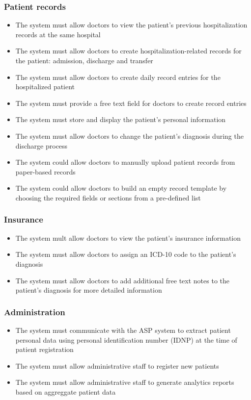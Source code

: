 \subsubsection{Patient records}
\begin{itemize}
    \item The system must allow doctors to view the patient's previous hospitalization records at the same hospital
    \item The system must allow doctors to create hospitalization-related records for the patient: admission, discharge and transfer
    \item The system must allow doctors to create daily record entries for the hospitalized patient
    \item The system must provide a free text field for doctors to create record entries 
    \item The system must store and display the patient's personal information
    \item The system must allow doctors to change the patient's diagnosis during the discharge process
    \item The system could allow doctors to manually upload patient records from paper-based records
    \item The system could allow doctors to build an empty record template by choosing the required fields or sections from a pre-defined list
\end{itemize}

\subsubsection{Insurance}
\begin{itemize}
    \item The system mult allow doctors to view the patient's insurance information
    \item The system must allow doctors to assign an ICD-10 code to the patient's diagnosis
    \item The system must allow doctors to add additional free text notes to the patient's diagnosis for more detailed information
\end{itemize}

\subsubsection{Administration}

\begin{itemize}
    \item The system must communicate with the ASP system to extract patient personal data using personal identification number (IDNP) at the time of patient registration
    \item The system must allow administrative staff to register new patients
    \item The system must allow administrative staff to generate analytics reports based on aggreggate patient data
\end{itemize}

